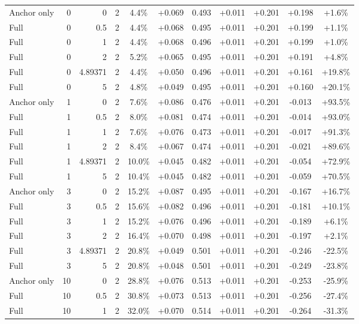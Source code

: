 \begin{table}[htbp]
\begin{tabular}{lrrrccccccc}
Anchor only & 0 & 0 & 2 & 4.4\% & +0.069 & 0.493 & +0.011 & +0.201 & +0.198 & +1.6\% \\
Full & 0 & 0.5 & 2 & 4.4\% & +0.068 & 0.495 & +0.011 & +0.201 & +0.199 & +1.1\% \\
Full & 0 & 1 & 2 & 4.4\% & +0.068 & 0.496 & +0.011 & +0.201 & +0.199 & +1.0\% \\
Full & 0 & 2 & 2 & 5.2\% & +0.065 & 0.495 & +0.011 & +0.201 & +0.191 & +4.8\% \\
Full & 0 & 4.89371 & 2 & 4.4\% & +0.050 & 0.496 & +0.011 & +0.201 & +0.161 & +19.8\% \\
Full & 0 & 5 & 2 & 4.8\% & +0.049 & 0.495 & +0.011 & +0.201 & +0.160 & +20.1\% \\
Anchor only & 1 & 0 & 2 & 7.6\% & +0.086 & 0.476 & +0.011 & +0.201 & -0.013 & +93.5\% \\
Full & 1 & 0.5 & 2 & 8.0\% & +0.081 & 0.474 & +0.011 & +0.201 & -0.014 & +93.0\% \\
Full & 1 & 1 & 2 & 7.6\% & +0.076 & 0.473 & +0.011 & +0.201 & -0.017 & +91.3\% \\
Full & 1 & 2 & 2 & 8.4\% & +0.067 & 0.474 & +0.011 & +0.201 & -0.021 & +89.6\% \\
Full & 1 & 4.89371 & 2 & 10.0\% & +0.045 & 0.482 & +0.011 & +0.201 & -0.054 & +72.9\% \\
Full & 1 & 5 & 2 & 10.4\% & +0.045 & 0.482 & +0.011 & +0.201 & -0.059 & +70.5\% \\
Anchor only & 3 & 0 & 2 & 15.2\% & +0.087 & 0.495 & +0.011 & +0.201 & -0.167 & +16.7\% \\
Full & 3 & 0.5 & 2 & 15.6\% & +0.082 & 0.496 & +0.011 & +0.201 & -0.181 & +10.1\% \\
Full & 3 & 1 & 2 & 15.2\% & +0.076 & 0.496 & +0.011 & +0.201 & -0.189 & +6.1\% \\
Full & 3 & 2 & 2 & 16.4\% & +0.070 & 0.498 & +0.011 & +0.201 & -0.197 & +2.1\% \\
Full & 3 & 4.89371 & 2 & 20.8\% & +0.049 & 0.501 & +0.011 & +0.201 & -0.246 & -22.5\% \\
Full & 3 & 5 & 2 & 20.8\% & +0.048 & 0.501 & +0.011 & +0.201 & -0.249 & -23.8\% \\
Anchor only & 10 & 0 & 2 & 28.8\% & +0.076 & 0.513 & +0.011 & +0.201 & -0.253 & -25.9\% \\
Full & 10 & 0.5 & 2 & 30.8\% & +0.073 & 0.513 & +0.011 & +0.201 & -0.256 & -27.4\% \\
Full & 10 & 1 & 2 & 32.0\% & +0.070 & 0.514 & +0.011 & +0.201 & -0.264 & -31.3\% \\

\end{tabular}
\end{table}
